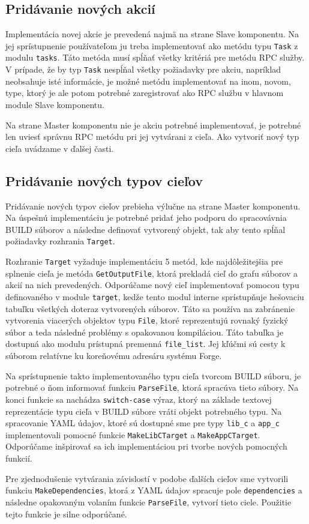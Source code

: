 \subsection{Prid\'{a}vanie nov\'{y}ch akci\'{i}}
\label{sec:contributing:actions}

Implementácia novej akcie je prevedená najmä na strane Slave komponentu. Na jej sprístupnenie
používateľom ju treba implementovať ako metódu typu \texttt{Task} z modulu \texttt{tasks}.
Táto metóda musí spĺňať všetky kritériá pre metódu RPC služby. V prípade, že by
typ \texttt{Task} nespĺňal všetky požiadavky pre akciu, napríklad neobsahuje isté
informácie, je možné metódu implementovať na inom, novom, type, ktorý je ale potom
potrebné zaregistrovať ako RPC službu v hlavnom module Slave komponentu.

Na strane Master komponentu nie je akciu potrebné implementovať, je potrebné len
uviesť správnu RPC metódu pri jej vytvárani z cieľa. Ako vytvoriť nový typ cieľa uvádzame
v ďalšej časti.

\subsection{Prid\'{a}vanie nov\'{y}ch typov cie\v{l}ov}
\label{sec:contributing:targets}

Pridávanie nových typov cieľov prebieha výlučne na strane Master komponentu. Na úspešnú
implementáciu je potrebné pridať jeho podporu do spracovávnia BUILD súborov a následne
definovať vytvorený objekt, tak aby tento spĺňal požiadavky rozhrania \texttt{Target}.

Rozhranie \texttt{Target} vyžaduje implementáciu 5 metód, kde najdôležitejšia pre
splnenie cieľa je metóda \texttt{GetOutputFile}, ktorá prekladá cieľ do grafu súborov
a akcií na nich prevedených. Odporúčame nový cieľ implementovať pomocou typu
definovaného v module \texttt{target}, kedže tento modul interne sprístupňuje
hešovaciu tabuľku všetkých doteraz vytvorených súborov. Táto sa používa na zabránenie
vytvorenia viacerých objektov typu \texttt{File}, ktoré reprezentujú rovnaký fyzický
súbor a teda následné problémy s opakovanou kompiláciou. Táto tabuľka je dostupná
ako modulu prístupná premenná \texttt{file\_list}. Jej kľúčmi sú cesty k súborom
relatívne ku koreňovému adresáru systému Forge.

Na sprístupnenie takto implementovaného typu cieľa tvorcom BUILD súboru, je potrebné
o ňom informovať funkciu \texttt{ParseFile}, ktorá spracúva tieto súbory. Na konci
funkcie sa nachádza \texttt{switch-case} výraz, ktorý na základe textovej reprezentácie
typu cieľa v BUILD súbore vráti objekt potrebného typu. Na spracovanie YAML údajov,
ktoré sú dostupné sme pre typy \texttt{lib\_c} a \texttt{app\_c} implementovali
pomocné funkcie \texttt{MakeLibCTarget} a \texttt{MakeAppCTarget}. Odporúčame inšpirovať
sa ich implementáciou pri tvorbe nových pomocných funkcií.

Pre zjednodušenie vytvárania závislostí v podobe ďalších cieľov sme vytvorili
funkciu \texttt{MakeDependencies}, ktorá z YAML údajov spracuje pole \texttt{dependencies}
a následne opakovaným volaním funkcie \texttt{ParseFile}, vytvorí tieto ciele. Použitie
tejto funkcie je silne odporúčané.
